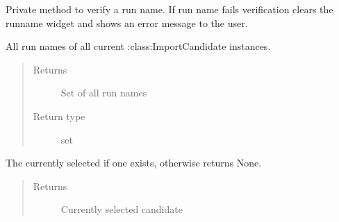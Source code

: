 \documentclass[letterpaper,10pt,english]{sphinxmanual}
\begin{document}
\begin{fulllineitems}
\begin{fulllineitems}
\end{fulllineitems}


\begin{fulllineitems}
\label{\detokenize{polo.windows:polo.windows.run_importer.RunImporterDialog._verify_run_name}}
Private method to verify a run name. If run name fails verification
clears the runname  widget and shows an error message to the user.

\end{fulllineitems}


\begin{fulllineitems}
\label{\detokenize{polo.windows:polo.windows.run_importer.RunImporterDialog.all_run_names}}
All run names of all current :class:ImportCandidate
instances.
\begin{quote}\begin{description}
\item[{Returns}] \leavevmode
Set of all run names

\item[{Return type}] \leavevmode
set

\end{description}\end{quote}

\end{fulllineitems}


\begin{fulllineitems}
\label{\detokenize{polo.windows:polo.windows.run_importer.RunImporterDialog.selected_candidate}}
The currently selected {\hyperref[\detokenize{polo.windows:polo.windows.run_importer.ImportCandidate}]{}} if one exists, otherwise
returns None.
\begin{quote}\begin{description}
\item[{Returns}] \leavevmode
Currently selected candidate


\end{description}
\end{quote}
\end{fulllineitems}
\end{fulllineitems}
\end{document}
